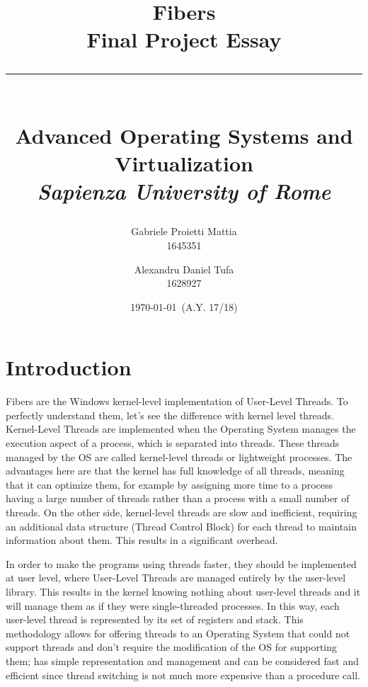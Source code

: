 \documentclass[a4paper,10pt]{article}
\title{
  \huge \textbf{Fibers} \\
  \Large Final Project Essay \\
  \noindent \rule{9cm}{0.2pt} \\
  \large Advanced Operating Systems and Virtualization \\
  \large \textit{Sapienza University of Rome}
}
\author{
  Gabriele Proietti Mattia \\ 1645351 \and Alexandru Daniel Tufa \\ 1628927
}
\date{\today\ (A.Y. 17/18)}
\begin{document}
\maketitle


\section{Introduction}
 Fibers are the Windows kernel-level implementation of User-Level Threads. To perfectly understand them, let’s see the difference with kernel level threads. Kernel-Level Threads are implemented when the Operating System manages the execution aspect of a process, which is separated into threads. These threads managed by the OS are called kernel-level threads or lightweight processes. The advantages here are that the kernel has full knowledge of all threads, meaning that it can optimize them, for example by assigning more time to a process having a large number of threads rather than a process with a small number of threads. On the other side, kernel-level threads are slow and inefficient, requiring an additional data structure (Thread Control Block) for each thread to maintain information about them. This results in a significant overhead.

 In order to make the programs using threads faster, they should be implemented at user level, where User-Level Threads are managed entirely by the user-level library. This results in the kernel knowing nothing about user-level threads and it will manage them as if they were single-threaded processes. In this way, each user-level thread is represented by its set of registers and stack. This methodology allows for offering threads to an Operating System that could not support threads and don’t require the modification of the OS for supporting them; has simple representation and management and can be considered fast and efficient since thread switching is not much more expensive than a procedure call.
\end{document}
